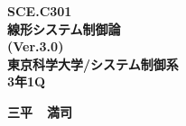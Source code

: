 \documentclass[a4paper,11pt]{jreport}
\def\mcnumber{SCE.C301}
\def\mctitle{線形システム制御論}
\def\mcdept{東京科学大学/システム制御系}
\def\mcfname{三平}
\def\mcgname{満司}
\def\mcyear{Ver.3.0}
\def\mcquoter{3年1Q}
\begin{document}
\thispagestyle{empty}
\vspace*{5cm}
\begin{center}
 \bfseries {\LARGE \mcnumber }\\[0.5cm]
 \bfseries {\Huge \mctitle }\\[0.5cm]
 \bfseries {\LARGE (\mcyear)}\\[0.5cm]
\vspace*{0.5cm}
 \bfseries {\LARGE \mcdept}\\[0.3cm]
 \bfseries {\LARGE \mcquoter}
\end{center}
\vspace*{7cm}
\begin{center}
 \Huge \bfseries  \mcfname \ \ \mcgname
\end{center}

\renewcommand{\thepage}{\roman{page}}  %

\tableofcontents{-1cm}

\newpage  %

\setcounter{page}{1}  %
\renewcommand{\thepage}{\arabic{page}}  %

\appendix

%
\end{document}
